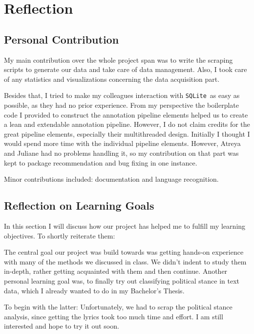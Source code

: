 \documentclass[11pt,a4paper]{article}
\begin{document}
\section{Reflection}

\subsection{Personal Contribution}\label{sec:contribution}

My main contribution over the whole project span was to write the scraping scripts to generate our data and take care of data management. Also, I took care of any statistics and visualizations concerning the data acquisition part. 

Besides that, I tried to make my colleagues interaction with \texttt{SQLite} as easy as possible, as they had no prior experience. From my perspective the boilerplate code I provided to construct the annotation pipeline elements helped us to create a lean and extendable annotation pipeline. However, I do not claim credits for the great pipeline elements, especially their multithreaded design.
Initially I thought I would spend more time with the individual pipeline elements. However, Atreya and Juliane had no problems handling it, so my contribution on that part was kept to package recommendation and bug fixing in one instance. 

Minor contributions included: documentation and language recognition.

\subsection{Reflection on Learning Goals}\label{sec:reflection}
In this section I will discuss how our project has helped me to fulfill my learning objectives. To shortly reiterate them: 

The central goal our project was build towards was getting hands-on experience with many of the methods we discussed in class. We didn't indent to study them in-depth, rather getting acquainted with them and then continue.
Another personal learning goal was, to finally try out classifying political stance in text data, which I already wanted to do in my Bachelor's Thesis.

To begin with the latter: Unfortunately, we had to scrap the political stance analysis, since getting the lyrics took too much time and effort. I am still interested and hope to try it out soon.
\end{document}
